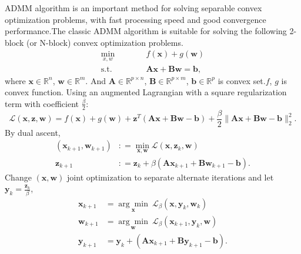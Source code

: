 \documentclass{article}
\begin{document}
{ADMM algorithm is an important method for solving separable convex optimization problems, with fast processing speed and good convergence performance.The classic ADMM algorithm is suitable for solving the following 2-block (or N-block) convex optimization problems.
\begin{equation}
    \begin{aligned}
        \underset{x,w}{\min}\qquad&\quad f(\mathbf x) + g(\mathbf w)\\
        \text{s.t.}\qquad&\quad  \mathbf A\mathbf x+\mathbf B\mathbf w = \mathbf b,
    \end{aligned}
    \label{admmlg}
\end{equation}
where $\mathbf x \in \mathbb{R}^n$, $\mathbf w \in \mathbb{R}^m$. And $\mathbf A \in \mathbb{R}^{p \times n}$, $\mathbf B \in \mathbb{R}^{p \times m}$, $\mathbf b \in \mathbb{R}^p$ is convex set.$f$, $g$ is convex function.
Using an augmented Lagrangian with a square regularization term with coefficient $\frac{\beta}{2}$:
\begin{equation}
    \mathcal{L}(\mathbf x,\mathbf z,\mathbf w) = f(\mathbf x) +g(\mathbf w) + \mathbf z^T(\mathbf A\mathbf x+\mathbf B\mathbf w-\mathbf b) + \frac{\beta}{2} \lVert \mathbf A\mathbf x+\mathbf B\mathbf w-\mathbf b \rVert_2^2.
\end{equation}
By dual ascent,
\begin{equation}
    \begin{aligned}
        (\mathbf x_{k+1},\mathbf w_{k+1}) & \colon = \underset{\mathbf x,\mathbf w}{\min} \mathcal{L}(\mathbf x,\mathbf z_k,\mathbf w)\\
        \mathbf z_{k+1} & \colon = \mathbf z_k + \beta (\mathbf A \mathbf x_{k+1} + \mathbf B \mathbf w_{k+1} - \mathbf b).
    \end{aligned}
\end{equation}
Change $(\mathbf x,\mathbf w)$ joint optimization to separate alternate iterations and let $\mathbf y_k = \frac{\mathbf z_k}{\beta}$,
\begin{equation}
    \begin{aligned}
        \mathbf x_{k+1} &  = \underset{\mathbf x}{\arg\min}\  \mathcal{L}_{\beta}(\mathbf x,\mathbf y_k,\mathbf w_{k})\\
        \mathbf w_{k+1} &  = \underset{\mathbf w}{\arg\min}\  \mathcal{L}_{\beta}(\mathbf x_{k+1},\mathbf y_k,\mathbf w)\\
        \mathbf y_{k+1} &  = \mathbf y_k + (\mathbf A \mathbf x_{k+1} + \mathbf B \mathbf y_{k+1} - \mathbf b).
    \end{aligned}
\end{equation}

}
\end{document}
